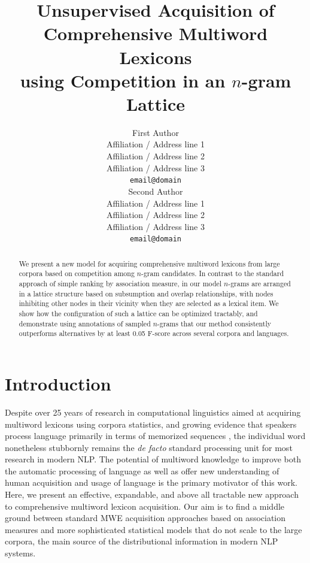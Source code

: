 \documentclass[11pt,letterpaper]{article}
\title{Unsupervised Acquisition of Comprehensive Multiword Lexicons \\ using Competition in an $n$-gram Lattice}
\author{First Author \\
  Affiliation / Address line 1 \\
  Affiliation / Address line 2 \\
  Affiliation / Address line 3 \\
  {\tt email@domain} \\\And
  Second Author \\
  Affiliation / Address line 1 \\
  Affiliation / Address line 2 \\
  Affiliation / Address line 3 \\
  {\tt email@domain} \\}
\date{}
\begin{document}
\maketitle


\begin{abstract}
We present a new model for acquiring comprehensive multiword lexicons from large corpora based on  competition among $n$-gram candidates. In contrast to the standard approach of simple ranking by association measure, in our model $n$-grams are arranged in a lattice structure based on subsumption and overlap relationships, with nodes inhibiting other nodes in their vicinity when they are selected as a lexical item. We show how the configuration of such a lattice can be optimized tractably, and demonstrate using annotations of sampled $n$-grams that our method consistently outperforms alternatives by at least 0.05 F-score across several corpora and languages.
\end{abstract}


\section{Introduction}

Despite over 25 years of research in computational linguistics aimed at acquiring multiword lexicons using corpora statistics, and growing evidence that speakers process language primarily in terms of memorized sequences \cite{Wray08}, the individual word nonetheless stubbornly remains the \textit{de facto} standard processing unit for most research in modern NLP. The potential of multiword knowledge to improve both the automatic processing of language as well as offer new understanding of human acquisition and usage of language is the primary motivator of this work. Here, we present an effective, expandable, and above all tractable new approach to comprehensive multiword lexicon acquisition. Our aim is to find a middle ground between standard MWE acquisition approaches based on association measures \cite{Ramisch14} and more sophisticated statistical models \cite{Newman12} that do not scale to the large corpora, the main source of the distributional information in modern NLP systems.


\end{document}
